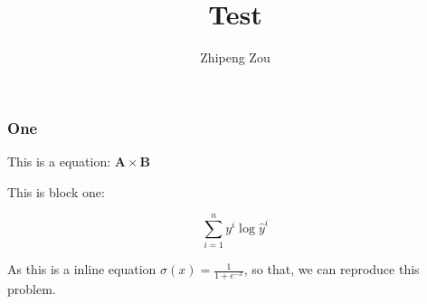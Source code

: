 \documentclass[a4paper, 12pt]{article}
\title{Test}
\author{Zhipeng Zou}
\begin{document}
  \tableofcontents
  \maketitle

  \part{}

  \section{One}
  This is a equation: $\mathbf{A} \times \mathbf{B}$

  This is block one: 

  $$
  \sum_{i=1}^n y^i\log \hat{y}^i
  $$

  As this is a inline equation $\sigma(x) = \frac{1}{1 + e^{-x}}$, so that, we can reproduce this problem.
\end{document}
